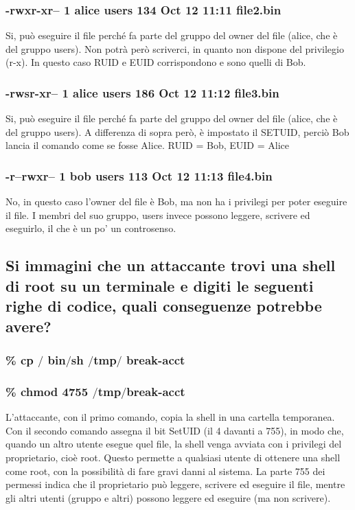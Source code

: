 \documentclass{report}
\begin{document}
\subsubsection{-rwxr-xr-- 1 alice users 134 Oct 12 11:11 file2.bin}
Si, può eseguire il file perché fa parte del gruppo del owner del file (alice, che è del gruppo users). Non potrà però scriverci, in quanto non dispone del privilegio (r-x). In questo caso RUID e EUID corrispondono e sono quelli di Bob.

\subsubsection{-rwsr-xr-- 1 alice users 186 Oct 12 11:12 file3.bin}
Si, può eseguire il file perché fa parte del gruppo del owner del file (alice, che è del gruppo users). A differenza di sopra però, è impostato il SETUID, perciò Bob lancia il comando come se fosse Alice. RUID = Bob, EUID = Alice

\subsubsection{-r--rwxr-- 1 bob users 113 Oct 12 11:13 file4.bin}
No, in questo caso l’owner del file è Bob, ma non ha i privilegi per poter eseguire il file. I membri del suo gruppo, users invece possono leggere, scrivere ed eseguirlo, il che è un po’ un controsenso.

\subsection{Si immagini che un attaccante trovi una shell di root su un terminale e digiti le seguenti righe di codice, quali conseguenze potrebbe avere?}
\subsubsection{\% cp $/$ bin$/$sh $/$tmp$/$ break-acct }
\subsubsection{\% chmod 4755 $/$tmp$/$break-acct}
L’attaccante, con il primo comando, copia la shell in una cartella temporanea. Con il secondo comando assegna il bit SetUID (il 4 davanti a 755), in modo che, quando un altro utente esegue quel file, la shell venga avviata con i privilegi del proprietario, cioè root. Questo permette a qualsiasi utente di ottenere una shell come root, con la possibilità di fare gravi danni al sistema.
La parte 755 dei permessi indica che il proprietario può leggere, scrivere ed eseguire il file, mentre gli altri utenti (gruppo e altri) possono leggere ed eseguire (ma non scrivere).
\end{document}
